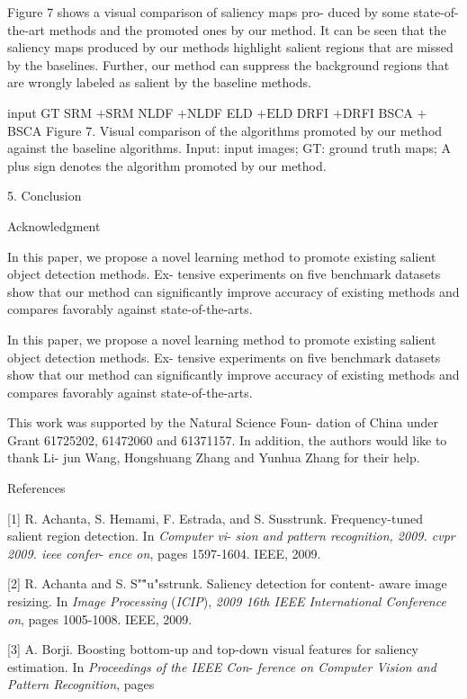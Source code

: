 \documentclass[a4paper,10pt]{article}
\begin{document}
Figure 7 shows a visual comparison of saliency maps pro- duced by some state-of-the-art methods and the promoted ones by our method. It can be seen that the saliency maps produced by our methods highlight salient regions that are missed by the baselines. Further, our method can suppress the background regions that are wrongly labeled as salient by the baseline methods.

input GT SRM $+\mathrm{S}\mathrm{R}\mathrm{M}$ NLDF $+$NLDF ELD $+\mathrm{E}\mathrm{L}\mathrm{D}$ DRFI $+$DRFI BSCA $+$BSCA Figure 7. Visual comparison of the algorithms promoted by our method against the baseline algorithms. Input: input images; GT: ground truth maps; A plus sign denotes the algorithm promoted by our method.

5. Conclusion

Acknowledgment

In this paper, we propose a novel learning method to promote existing salient object detection methods. Ex- tensive experiments on five benchmark datasets show that our method can significantly improve accuracy of existing methods and compares favorably against state-of-the-arts.

In this paper, we propose a novel learning method to promote existing salient object detection methods. Ex- tensive experiments on five benchmark datasets show that our method can significantly improve accuracy of existing methods and compares favorably against state-of-the-arts.

This work was supported by the Natural Science Foun- dation of China under Grant 61725202, 61472060 and 61371157. In addition, the authors would like to thank Li- jun Wang, Hongshuang Zhang and Yunhua Zhang for their help.

References

[1] R. Achanta, S. Hemami, F. Estrada, and S. Susstrunk. Frequency-tuned salient region detection. In {\it Computer vi}- {\it sion and pattern recognition, 2009. cvpr 2009. ieee confer}- {\it ence on}, pages 1597-1604. IEEE, 2009.

[2] R. Achanta and S. S"\""{u}"sstrunk. Saliency detection for content- aware image resizing. In {\it Image Processing} ({\it ICIP}), {\it 2009 16th IEEE International Conference on}, pages 1005-1008. IEEE, 2009.

[3] A. Borji. Boosting bottom-up and top-down visual features for saliency estimation. In {\it Proceedings of the IEEE Con}- {\it ference on Computer Vision and Pattern Recognition}, pages
\end{document}
